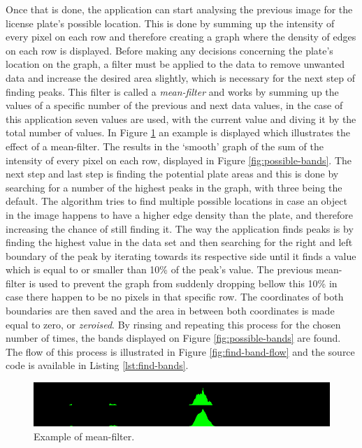 Once that is done, the application can start analysing the previous image for the license plate's possible location. This is done by summing up the intensity of every pixel on each row and therefore creating a graph where the density of edges on each row is displayed. Before making any decisions concerning the plate's location on the graph, a filter must be applied to the data to remove unwanted data and increase the desired area slightly, which is necessary for the next step of finding peaks. This filter is called a \emph{mean-filter} and works by summing up the values of a specific number of the previous and next data values, in the case of this application seven values are used, with the current value and diving it by the total number of values. In Figure \ref{fig:mean-filter} an example is displayed which illustrates the effect of a mean-filter. The results in the `smooth' graph of the sum of the intensity of every pixel on each row, displayed in Figure \ref{fig:possible-bands}. The next step and last step is finding the potential plate areas and this is done by searching for a number of the highest peaks in the graph, with three being the default. The algorithm tries to find multiple possible locations in case an object in the image happens to have a higher edge density than the plate, and therefore increasing the chance of still finding it. The way the application finds peaks is by finding the highest value in the data set and then searching for the right and left boundary of the peak by iterating towards its respective side until it finds a value which is equal to or smaller than 10\% of the peak's value. The previous mean-filter is used to prevent the graph from suddenly dropping bellow this 10\% in case there happen to be no pixels in that specific row. The coordinates of both boundaries are then saved and the area in between both coordinates is made equal to zero, or \emph{zeroised}. By rinsing and repeating this process for the chosen number of times, the bands displayed on Figure \ref{fig:possible-bands} are found. The flow of this process is illustrated in Figure \ref{fig:find-band-flow} and the source code is available in Listing \ref{lst:find-bands}.

\begin{figure}[ht]
    \centering
    \includegraphics[width=\textwidth]{plaatjes/mean-filter}
    \caption{Example of mean-filter.}
    \label{fig:mean-filter}
\end{figure}

